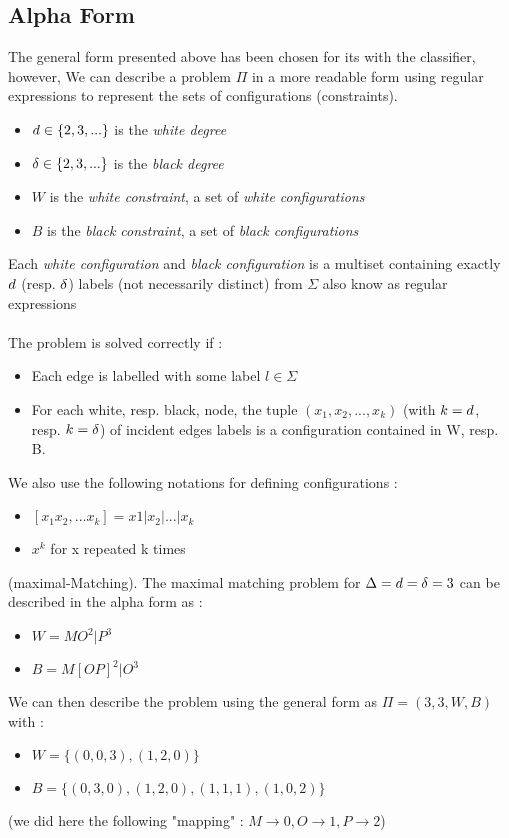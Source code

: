\subsection{Alpha Form}
The general form presented above has been chosen for its with the classifier, however, We can describe a problem $\Pi$ in a more readable form using regular expressions \cite{1,LB_MM} to represent the sets of configurations (constraints).
\begin{itemize}
    \item $d\in\{2,3,...\}$ is the \textit{white degree}
    \item $\delta\in\{2,3,...\}$ is the \textit{black degree}
    \item $W$ is the \textit{white constraint}, a set of \textit{white configurations}
    \item $B$ is the \textit{black constraint}, a set of \textit{black configurations}
\end{itemize}
Each \textit{white configuration}  and \textit{black configuration} is a multiset containing exactly $d$ (resp. $\delta$) labels (not necessarily distinct) from $\Sigma$ also know as regular expressions\\\\
The problem is solved correctly if :
\begin{itemize}
    \item Each edge is labelled with some label $l\in\Sigma$
    \item For each white, resp. black, node, the tuple $(x_1,x_2, ..., x_k)$ (with $k=d$, resp. $k=\delta$) of incident edges labels is a configuration contained in W, resp. B.
\end{itemize}
We also use the following notations for defining configurations :
\begin{itemize}
    \item $[x_1x_2,...x_k] = x1|x_2|...|x_k$
    \item $x^k$ for x repeated k times
\end{itemize}
\begin{exmp}
(maximal-Matching). The maximal matching problem for $\Delta = d = \delta = 3$ can be described in the alpha form as :
\begin{itemize}
    \item $W = MO^{2}|P^{3}$
    \item $B = M[OP]^{2}|O^{3}$
\end{itemize}
We can then describe the problem using the general form as
$\Pi = (3,3,W,B)$ with :
\begin{itemize}
    \item $W = \{(0,0,3),(1, 2, 0)\}$
    \item $B = \{(0,3,0),(1,2,0),(1,1,1),(1,0,2)\}$
\end{itemize}
(we did here the following "mapping" : $M\rightarrow 0, O\rightarrow 1, P\rightarrow 2$)
\end{exmp}
